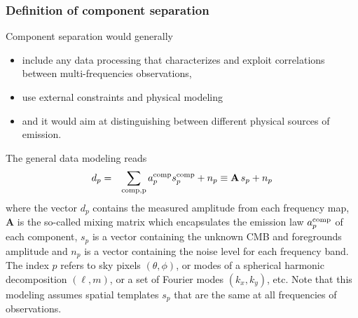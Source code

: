 \subsubsection{Definition of component separation}

Component separation would generally
\begin{itemize}
	\item include any data processing that characterizes and exploit correlations between multi-frequencies observations,
	\item use external constraints and physical modeling
	\item and it would aim at distinguishing between different physical sources of emission.
\end{itemize}
The general data modeling reads
\begin{eqnarray}
	\centering	
		d_p &=& \sum_{\rm comp, p} a_p^{\rm comp} s^{\rm comp}_p + n_p \equiv \mathbf{A}\,s_p + n_p
	\label{eq:comp_sep_data_modeling}
\end{eqnarray}
where the vector $d_p$ contains the measured amplitude from each frequency map, $\mathbf{A}$ is the so-called mixing matrix which encapsulates the emission law $a_p^{\rm comp}$ of each component, $s_p$ is a vector containing the unknown CMB and foregrounds amplitude and $n_p$ is a vector containing the noise level for each frequency band. The index $p$ refers to sky pixels $\left( \theta, \phi \right)$, or modes of a spherical harmonic decomposition $\left( \ell, m\right)$, or a set of Fourier modes $\left(k_x,k_y\right)$, etc. Note that this modeling assumes spatial templates $s_p$ that are the same at all frequencies of observations.

